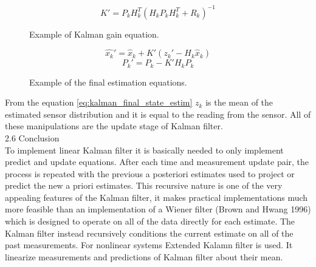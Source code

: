 \documentclass[../../main]{subfiles}
\begin{document}
\begin{figure} [!ht]
  \centering    
    \begin{equation}
       K' = P_k H_k^T (H_k P_k H_k^T + R_k) ^ {-1}
    \end{equation}
  \caption{Example of Kalman gain equation.}
\end{figure}

\begin{figure} [!ht]
  \centering    
    \begin{equation}
       \label{eq:kalman_final_state_estim}
       \hat{x_k}' = \hat{x}_{k} + K' (z_k' - H_k \hat{x}_{k})
    \end{equation}
    \begin{equation}
       P_k' = P_k - K' H_k P_k
    \end{equation}
  \caption{Example of the final estimation equations.}
\end{figure}

From the equation \ref{eq:kalman_final_state_estim} $z_k$ is the mean of the estimated sensor distribution and it is equal to the reading from the sensor.
All of these manipulations are the update stage of Kalman filter. \\

2.6 Conclusion \\

To implement linear Kalman filter it is basically needed to only implement predict and update equations. After each time and measurement update pair, the process is repeated with the previous a posteriori estimates used to project or predict the new a priori estimates. This recursive nature is one of the very appealing features of the Kalman filter, it makes practical
implementations much more feasible than an implementation of a Wiener filter (Brown and Hwang 1996) which is designed to operate on all of the data directly for each estimate. The Kalman filter instead recursively conditions the current estimate on all of the past measurements.
For nonlinear systems Extended Kalamn filter is used. It linearize measurements and predictions of Kalman filter about their mean.
\end{document}
